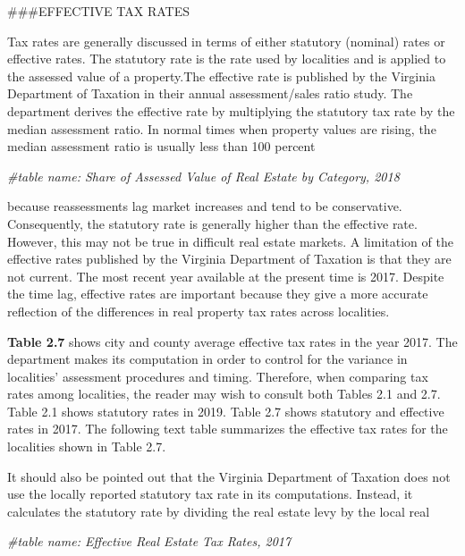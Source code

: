 \documentclass[
]{book}
\newenvironment{Shaded}{\begin{snugshade}}{\end{snugshade}}
\newcommand{\CommentTok}[1]{\textcolor[rgb]{0.56,0.35,0.01}{\textit{#1}}}
\begin{document}
\#\#\#EFFECTIVE TAX RATES

Tax rates are generally discussed in terms of either statutory (nominal) rates or effective rates. The statutory rate is the rate used by localities and is applied to the assessed value of a property.The effective rate is published by the Virginia Department of Taxation in their annual assessment/sales ratio study. The department derives the effective rate by multiplying the statutory tax rate by the median assessment ratio. In normal times when property values are rising, the median assessment ratio is usually less than 100 percent

\begin{Shaded}
\begin{Highlighting}[]
\CommentTok{\#table name: Share of Assessed Value of Real Estate by Category, 2018}
\end{Highlighting}
\end{Shaded}

because reassessments lag market increases and tend to be conservative. Consequently, the statutory rate is generally higher than the effective rate. However, this may not be true in difficult real estate markets. A limitation of the effective rates published by the Virginia Department of Taxation is that they are not current. The most recent year available at the present time is 2017. Despite the time lag, effective rates are important because they give a more accurate reflection of the differences in real property tax rates across localities.

\textbf{Table 2.7} shows city and county average effective tax rates in the year 2017. The department makes its computation in order to control for the variance in localities' assessment procedures and timing. Therefore, when comparing tax rates among localities, the reader may wish to consult both Tables 2.1 and 2.7. Table 2.1 shows statutory rates in 2019. Table 2.7 shows statutory and effective rates in 2017. The following text table summarizes the effective tax rates for the localities shown in Table 2.7.

It should also be pointed out that the Virginia Department of Taxation does not use the locally reported statutory tax rate in its computations. Instead, it calculates the statutory rate by dividing the real estate levy by the local real

\begin{Shaded}
\begin{Highlighting}[]
\CommentTok{\#table name: Effective Real Estate Tax Rates, 2017}
\end{Highlighting}
\end{Shaded}
\end{document}
